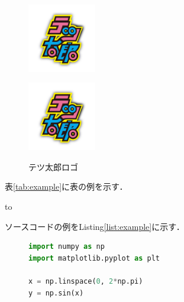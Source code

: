 \begin{figure}[tb]
    \begin{minipage}[b]{0.45\linewidth}
        \centering
        \includegraphics[width=30mm]{assets/introduction/tetsutaro-logo.png}
        \label{fig:tetsutaro-logo2}
    \end{minipage}
    \begin{minipage}[b]{0.45\linewidth}
        \centering
        \includegraphics[width=30mm]{assets/introduction/tetsutaro-logo.png}
        \label{fig:tetsutaro-logo3}
    \end{minipage}
    \caption{テツ太郎ロゴ}
\end{figure}

表\ref{tab:example}に表の例を示す．

\begin{table}[tb]
    \caption{表の例}
    \label{tab:example}
    \hbox to
\end{table}

ソースコードの例をListing\ref{list:example}に示す．

\begin{figure}[tb]
    \begin{lstlisting}[language=Python, caption={ソースコードの例}, label={list:example}]
import numpy as np
import matplotlib.pyplot as plt

x = np.linspace(0, 2*np.pi)
y = np.sin(x)
\end{lstlisting}
\end{figure}


